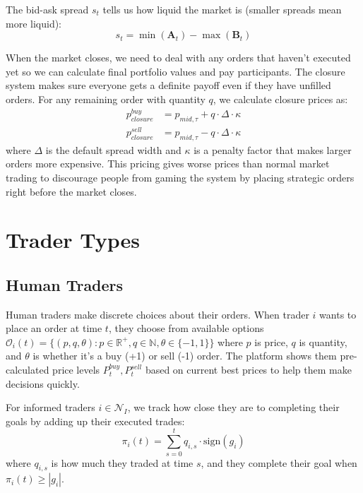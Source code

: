 The bid-ask spread $s_t$ tells us how liquid the market is (smaller spreads mean more liquid):
\begin{equation}
s_t = \min(\mathbf{A}_t) - \max(\mathbf{B}_t)
\end{equation}

When the market closes, we need to deal with any orders that haven't executed yet so we can calculate final portfolio values and pay participants. The closure system makes sure everyone gets a definite payoff even if they have unfilled orders. For any remaining order with quantity $q$, we calculate closure prices as:
\begin{align}
p_{closure}^{buy} &= p_{mid,\tau} + q \cdot \Delta \cdot \kappa \\
p_{closure}^{sell} &= p_{mid,\tau} - q \cdot \Delta \cdot \kappa
\end{align}
where $\Delta$ is the default spread width and $\kappa$ is a penalty factor that makes larger orders more expensive. This pricing gives worse prices than normal market trading to discourage people from gaming the system by placing strategic orders right before the market closes.

\section{Trader Types}

\subsection{Human Traders}

Human traders make discrete choices about their orders. When trader $i$ wants to place an order at time $t$, they choose from available options $\mathcal{O}_i(t) = \{(p, q, \theta) : p \in \mathbb{R}^+, q \in \mathbb{N}, \theta \in \{-1, 1\}\}$ where $p$ is price, $q$ is quantity, and $\theta$ is whether it's a buy (+1) or sell (-1) order. The platform shows them pre-calculated price levels $P_t^{buy}, P_t^{sell}$ based on current best prices to help them make decisions quickly.

For informed traders $i \in \mathcal{N}_I$, we track how close they are to completing their goals by adding up their executed trades:
\begin{equation}
\pi_i(t) = \sum_{s=0}^{t} q_{i,s} \cdot \text{sign}(g_i)
\end{equation}
where $q_{i,s}$ is how much they traded at time $s$, and they complete their goal when $\pi_i(t) \geq |g_i|$.

